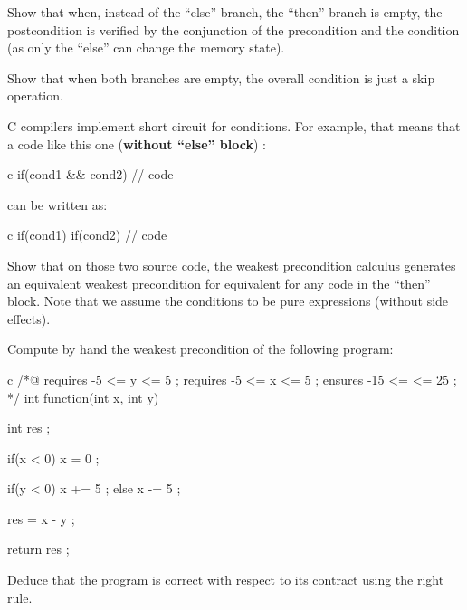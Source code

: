 Show that when, instead of the ``else'' branch, the ``then'' branch is empty,
the postcondition is verified by the conjunction of the precondition and
the condition (as only the ``else'' can change the memory state).

Show that when both branches are empty, the overall condition is just a
skip operation.






C compilers implement short circuit for conditions. For example, that
means that a code like this one (\textbf{without ``else'' block}) :


\begin{CodeBlock}{c}
if(cond1 && cond2){
  // code
}
\end{CodeBlock}



can be written as:



\begin{CodeBlock}{c}
if(cond1){
  if(cond2){
    // code
  }
}
\end{CodeBlock}



Show that on those two source code, the weakest precondition calculus
generates an equivalent weakest precondition for equivalent for any code
in the ``then'' block. Note that we assume the conditions to be pure
expressions (without side effects).






Compute by hand the weakest precondition of the following program:


\begin{CodeBlock}{c}
/*@
  requires -5 <= y <= 5 ;
  requires -5 <= x <= 5 ;
  ensures  -15 <= \result <= 25 ;
*/
int function(int x, int y){
  int res ;

  if(x < 0){
    x = 0 ;
  }

  if(y < 0){
    x += 5 ;
  } else {
    x -= 5 ;
  }

  res = x - y ;

  return res ;
}
\end{CodeBlock}


Deduce that the program is correct with respect to its contract using the
right rule.


